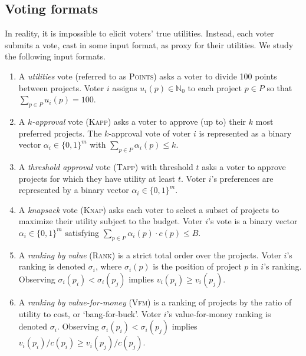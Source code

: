 \documentclass[mnsc,blindrev]{informs3_freeuse} %
\newcommand{\kibitz}[2]{\ifnum\Comments=1{\color{#1}{#2}}\fi}
\newcommand{\kg}[1]{\kibitz{brown}{[Kobi says:#1]}}
\newcommand{\points}{\textsc{Points}}
\renewcommand{\rank}{\textsc{Rank}}
\newcommand{\vfm}{\textsc{Vfm}}
\newcommand{\knap}{\textsc{Knap}}
\newcommand{\kapp}{\textsc{Kapp}}
\newcommand{\tapp}{\textsc{Tapp}}
\begin{document}
\subsection{Voting formats}
In reality, it is impossible to elicit  voters' true utilities. Instead, each voter submits a vote, cast in some input format, as proxy for their utilities. We study the following input formats.
\begin{enumerate}
    \item A \textit{utilities}  vote  (referred to as \points) asks a voter to divide 100 points between projects. Voter $i$ assigns $u_i(p) \in \mathbb{N}_0$ to each project $p\in P$ so that $\sum_{p\in P} u_i(p) =100. $ 
       
     \item  A \textit{$k$-approval}   vote (\kapp) asks a voter to approve (up to) their  $k$ most preferred projects. The $k$-approval vote of voter $i$ is represented as a binary vector $\alpha_i\in\{0,1\}^m$ with $\sum_{p\in P}\alpha_i(p)\leq k$.
      
    
    \item A \textit{threshold approval} vote  (\tapp) with threshold $t$ asks a voter to approve projects for which they have utility  at least $t$.  Voter $i$'s preferences are represented by a  binary vector $\alpha_i\in\{0,1\}^m$. 
    
    \item A \textit{knapsack} vote  (\knap)   asks each voter to select a subset of projects to maximize their utility subject to the budget. Voter $i$'s vote is a binary vector $\alpha_i\in\{0,1\}^m$ satisfying $\sum_{p\in P}  \alpha_i(p) \cdot c(p) \leq B$. %
    
    \item A \textit{ranking by value} (\rank)  is a strict total order over the projects. Voter $i$'s ranking is denoted $\sigma_i$, where  $\sigma_i(p)$ is the position of project $p$ in $i$'s ranking.  Observing   $\sigma_i(p_i) < \sigma_i( p_j)$    implies $v_i(p_i) \geq v_i(p_j)$. %

    \item A \textit{ranking by value-for-money} (\vfm) is a ranking of projects by the ratio of utility to cost, or `bang-for-buck'.  Voter $i$'s value-for-money ranking is denoted $\sigma_i$. Observing   $\sigma_i(p_i) < \sigma_i( p_j)$    implies $v_i(p_i)/c(p_i) \geq v_i(p_j)/c(p_j)$.
\end{enumerate}
\end{document}
